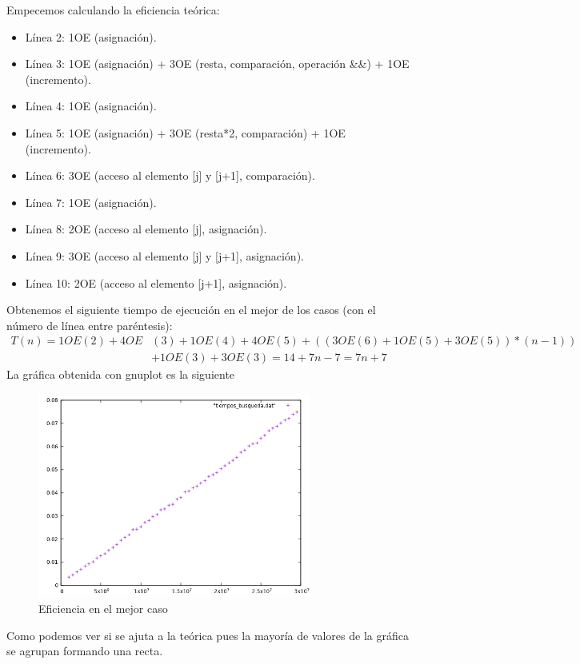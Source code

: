 \documentclass{article}
\begin{document}
Empecemos calculando la eficiencia teórica:
\begin{itemize}
	\item Línea 2: 1OE (asignación).
	\item Línea 3: 1OE (asignación) + 3OE (resta, comparación,
          operación \&\&) + 1OE (incremento).
	\item Línea 4: 1OE (asignación).
	\item Línea 5: 1OE (asignación) + 3OE (resta*2, comparación) + 1OE (incremento).
	\item Línea 6: 3OE (acceso al elemento [j] y [j+1], comparación).
	\item Línea 7: 1OE (asignación).
	\item Línea 8: 2OE (acceso al elemento [j], asignación).
	\item Línea 9: 3OE (acceso al elemento [j] y [j+1], asignación).
	\item Línea 10: 2OE (acceso al elemento [j+1], asignación).
\end{itemize}
Obtenemos el siguiente tiempo de ejecución en el mejor de los casos
(con el número de línea entre paréntesis):
\begin{align*}
  T(n)= 1OE(2) + 4OE&(3) + 1OE(4) + 4OE(5) + (( 3OE(6) + 1OE(5) +
  3OE(5) )*(n-1))\\& + 1OE(3) + 3OE(3) = 14+7n-7 = 7n+7
\end{align*}
La gráfica obtenida con gnuplot es la siguiente
\begin{figure}[H]
  \caption{Eficiencia en el mejor caso}
  \centering
  \includegraphics[width=0.8\textwidth]{ejer5/grafica.png}
\end{figure}
Como podemos ver si se ajuta a la teórica pues la mayoría de valores
de la gráfica se agrupan formando una recta.
\end{document}
